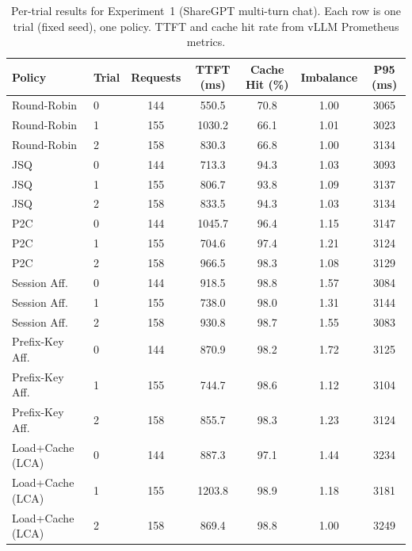 \begin{table}[h]
    \caption{Per-trial results for Experiment~1 (ShareGPT multi-turn chat). Each row is one trial (fixed seed), one policy. TTFT and cache hit rate from vLLM Prometheus metrics.}
    \label{tab:per_trial}
    \centering
    \small
    \begin{tabular}{@{}llccccc@{}}
        \toprule
        \textbf{Policy} & \textbf{Trial} & \textbf{Requests} & \textbf{TTFT (ms)} & \textbf{Cache Hit (\%)} & \textbf{Imbalance} & \textbf{P95 (ms)} \\
        \midrule
        Round-Robin     & 0 & 144 & 550.5 & 70.8 & 1.00 & 3065 \\
        Round-Robin     & 1 & 155 & 1030.2 & 66.1 & 1.01 & 3023 \\
        Round-Robin     & 2 & 158 & 830.3 & 66.8 & 1.00 & 3134 \\
        \midrule
        JSQ             & 0 & 144 & 713.3 & 94.3 & 1.03 & 3093 \\
        JSQ             & 1 & 155 & 806.7 & 93.8 & 1.09 & 3137 \\
        JSQ             & 2 & 158 & 833.5 & 94.3 & 1.03 & 3134 \\
        \midrule
        P2C             & 0 & 144 & 1045.7 & 96.4 & 1.15 & 3147 \\
        P2C             & 1 & 155 & 704.6 & 97.4 & 1.21 & 3124 \\
        P2C             & 2 & 158 & 966.5 & 98.3 & 1.08 & 3129 \\
        \midrule
        Session Aff.    & 0 & 144 & 918.5 & 98.8 & 1.57 & 3084 \\
        Session Aff.    & 1 & 155 & 738.0 & 98.0 & 1.31 & 3144 \\
        Session Aff.    & 2 & 158 & 930.8 & 98.7 & 1.55 & 3083 \\
        \midrule
        Prefix-Key Aff. & 0 & 144 & 870.9 & 98.2 & 1.72 & 3125 \\
        Prefix-Key Aff. & 1 & 155 & 744.7 & 98.6 & 1.12 & 3104 \\
        Prefix-Key Aff. & 2 & 158 & 855.7 & 98.3 & 1.23 & 3124 \\
        \midrule
        Load+Cache (LCA) & 0 & 144 & 887.3 & 97.1 & 1.44 & 3234 \\
        Load+Cache (LCA) & 1 & 155 & 1203.8 & 98.9 & 1.18 & 3181 \\
        Load+Cache (LCA) & 2 & 158 & 869.4 & 98.8 & 1.00 & 3249 \\
        \bottomrule
    \end{tabular}
\end{table}
